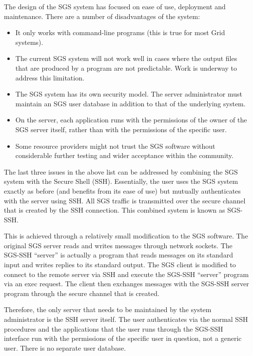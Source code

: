 \documentclass[times,10pt,twocolumn,8.5x11]{article}
\begin{document}
\label{sec:disadvantages}
The design of the SGS system has focused on ease of use, deployment and maintenance.  There are a number of disadvantages of the system:
\begin{itemize}
\item It only works with command-line programs (this is true for most Grid systems).
\item The current SGS system will not work well in cases where the output files that are produced by a program are not predictable.  Work is underway to address this limitation.
\item The SGS system has its own security model.  The server administrator must maintain an SGS user database in addition to that of the underlying system.
\item On the server, each application runs with the permissions of the owner of the SGS server itself, rather than with the permissions of the specific user.
\item Some resource providers might not trust the SGS software without considerable further testing and wider acceptance within the community.
\end{itemize}

The last three issues in the above list can be addressed by combining the SGS system with the Secure Shell (SSH).  Essentially, the user uses the SGS system exactly as before (and benefits from its ease of use) but mutually authenticates with the server using SSH.  All SGS traffic is transmitted over the secure channel that is created by the SSH connection.  This combined system is known as SGS-SSH.

This is achieved through a relatively small modification to the SGS software.  The original SGS server reads and writes messages through network sockets.  The SGS-SSH ``server'' is actually a program that reads messages on its standard input and writes replies to its standard output.  The SGS client is modified to connect to the remote server via SSH and execute the SGS-SSH ``server'' program via an exec request.  The client then exchanges messages with the SGS-SSH server program through the secure channel that is created.

Therefore, the only server that needs to be maintained by the system administrator is the SSH server itself.  The user authenticates via the normal SSH procedures and the applications that the user runs through the SGS-SSH interface run with the permissions of the specific user in question, not a generic user.  There is no separate user database.
\end{document}
